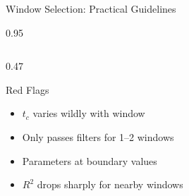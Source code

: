 \documentclass[9pt, aspectratio=169, t]{beamer}
\begin{document}
\begin{frame}{Window Selection: Practical Guidelines}
\begin{cminipage}{0.95\textwidth}
{\begin{columns}[T]
\begin{column}{0.47\textwidth}
            \begin{block}{Red Flags}
                \begin{itemize}\setlength{\itemsep}{0pt}
                    \item $t_c$ varies wildly with window
                    \item Only passes filters for 1--2 windows
                    \item Parameters at boundary values
                    \item $R^2$ drops sharply for nearby windows
                \end{itemize}
            \end{block}
        \end{column}
    \end{columns}
    }
    \end{cminipage}
\end{frame}
\end{document}
